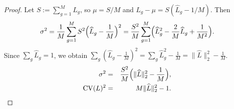 \documentclass[10pt,a4paper]{amsart}
\begin{document}
\begin{proof}
Let $S:=\sum_{g=1}^M L_g$, so $\mu=S/M$ and $L_g-\mu=S(\widehat L_g-1/M)$.
Then
\[
\sigma^2
= \frac{1}{M}\sum_{g=1}^M S^2\Bigl(\widehat L_g-\frac{1}{M}\Bigr)^2
= \frac{S^2}{M}\sum_{g=1}^M \Bigl(\widehat L_g^2 - \frac{2}{M}\widehat L_g + \frac{1}{M^2}\Bigr).
\]
Since $\sum_g \widehat L_g = 1$, we obtain
$\sum_g (\widehat L_g-\frac{1}{M})^2 = \sum_g \widehat L_g^2 - \frac{1}{M} = \|\widehat L\|_2^2 - \frac{1}{M}$.
\begin{eqnarray*}
\sigma^2
&=& \frac{S^2}{M}\Bigl(\|\widehat L\|_2^2 - \frac{1}{M}\Bigr),\\
\mathrm{CV}(L)^2
&=& M\|\widehat L\|_2^2 - 1.
\end{eqnarray*}
\end{proof}
\end{document}
